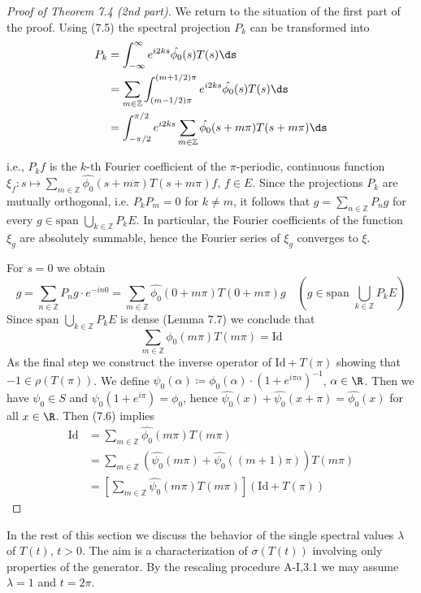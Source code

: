 \begin{proof}[Proof of Theorem 7.4 (2nd part)]
We return to the situation of the first part of the proof.
Using (7.5) the spectral projection $P_{k}$ can be transformed into
\begin{align*}
P_{k} &= \int_{-\infty}^{\infty} e^{i2ks}\hat{\phi_{0}}(s)T(s)\ds \\
&= \sum_{m\in\mathbb{Z}} \int_{(m-1/2)\pi}^{(m+1/2)\pi} e^{i2ks}\hat{\phi_{0}}(s)T(s)\ds \\
&= \int_{-\pi/2}^{\pi/2} e^{i2ks}\sum_{m\in\mathbb{Z}}\hat{\phi_{0}}(s+m\pi)T(s+m\pi)\ds
\end{align*}


i.e., $P_{k}f$ is the $k$-th Fourier coefficient of the $\pi$-periodic, continuous function $\xi_{f} \colon s \mapsto \sum_{m\in\mathbb{Z}} \hat{\phi_{0}}(s+m\pi)T(s+m\pi)f$, $f \in E$.
Since the projections $P_{k}$ are mutually orthogonal, i.e. $P_{k}P_{m} = 0$ for $k \neq m$, it follows that $g = \sum_{n\in\mathbb{Z}} P_{n}g$ for every $g \in \text{span }\bigcup_{k\in\mathbb{Z}} P_{k}E$.
In particular, the Fourier coefficients of the function $\xi_{g}$ are absolutely summable, hence the Fourier series of $\xi_{g}$ converges to $\xi$.

For $s = 0$ we obtain
\[
g = \sum_{n\in\mathbb{Z}} P_{n}g\cdot e^{-in0} = \sum_{m\in\mathbb{Z}} \hat{\phi_{0}}(0 + m\pi)T(0 + m\pi)g \quad 
\left(g \in \text{span }\bigcup_{k\in\mathbb{Z}} P_{k}E\right)
\]
Since $\text{span }\bigcup_{k\in\mathbb{Z}} P_{k}E$ is dense (Lemma 7.7) we conclude that
\begin{equation}\label{eq:a3-7.7}
\sum_{m\in\mathbb{Z}} \phi_{0}(m\pi)T(m\pi) = \text{Id}
\end{equation}
As the final step we construct the inverse operator of $\text{Id} + T(\pi)$ showing that $-1 \in \rho(T(\pi))$.
We define $\psi_{0}(\alpha) \coloneqq \phi_{0}(\alpha)\cdot(1 + e^{i\pi\alpha})^{-1}$, $\alpha \in \R$.
Then we have $\psi_{0} \in S$ and $\psi_{0}(1 + e^{i\pi}) = \phi_{0}$,
hence $\hat{\psi_{0}}(x) + \hat{\psi_{0}}(x + \pi) = \hat{\phi_{0}}(x)$ for all $x \in \R$.
Then (7.6) implies
\begin{align*}
\text{Id} &= \sum_{m\in\mathbb{Z}} \hat{\phi_{0}}(m\pi)T(m\pi) \\
&= \sum_{m\in\mathbb{Z}} (\hat{\psi_{0}}(m\pi) + \hat{\psi_{0}}((m+1)\pi))T(m\pi) \\
&= [\sum_{m\in\mathbb{Z}} \hat{\psi_{0}}(m\pi)T(m\pi)](\text{Id} + T(\pi))
\end{align*}
\end{proof}
In the rest of this section we discuss the behavior of the single spectral values $\lambda$ of $T(t)$, $t > 0$.
The aim is a characterization of $\sigma(T(t))$ involving only properties of the generator.
By the rescaling procedure A-I,3.1 we may assume $\lambda = 1$ and $t = 2\pi$.

